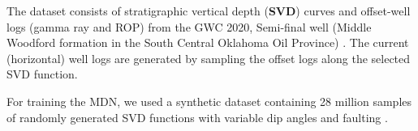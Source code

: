 
The dataset consists of stratigraphic vertical depth (\textbf{SVD}) curves and offset-well logs (gamma ray and ROP) from the GWC 2020, Semi-final well (Middle Woodford formation in the South Central Oklahoma Oil Province) \cite{gwc-paper}. 
The current (horizontal) well logs are generated by sampling the offset logs along the selected SVD function.


For training the MDN, we used a synthetic dataset containing 28 million samples of randomly generated SVD functions with variable dip angles and faulting \cite{trainingdata}.